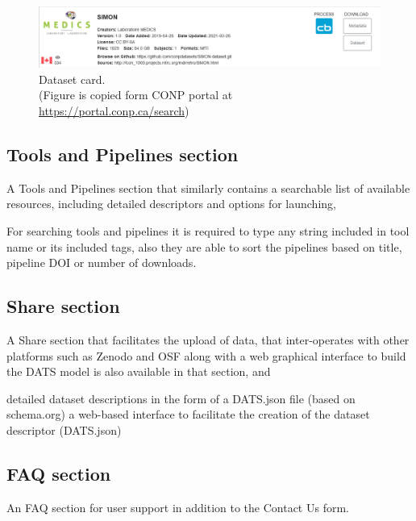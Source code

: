 \begin{figure}[ht]
  \centering
  \includegraphics[width=\textwidth]{figures/dataCard.png}
  \caption{Dataset card. \\(Figure is copied form CONP portal at \url{https://portal.conp.ca/search})}
  \label{fig:data_card}
\end{figure} 


\subsection{Tools and Pipelines section}
A Tools and Pipelines section that similarly contains a searchable list of available resources, including detailed descriptors and options for launching,

For searching tools and pipelines it is required to type any string included in tool name or its included tags, also they are able to sort the pipelines based on title, pipeline DOI or number of downloads.

\subsection{Share section}
A Share section that facilitates the upload of data, that inter-operates with other platforms such as Zenodo and OSF along with a web graphical interface to build the DATS model is also available in that section, and 

detailed dataset descriptions in the form of a DATS.json file (based on schema.org)
    a web-based interface to facilitate the creation of the dataset descriptor (DATS.json)

\subsection{FAQ section}
An FAQ section for user support in addition to the Contact Us form.









